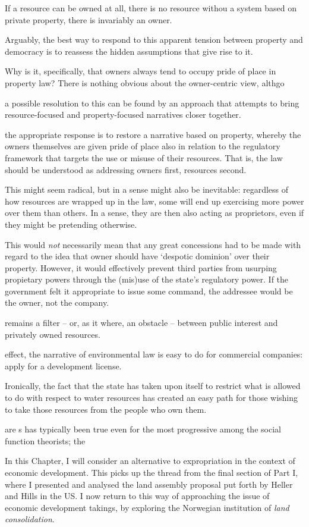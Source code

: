 {{If a resource can be owned at all, there is no resource withou  a system based on private property, there is invariably an owner.

Arguably, the best way to respond to this apparent tension between property and democracy is to reassess the hidden assumptions that give rise to it.




Why is it, specifically, that owners always tend to occupy pride of place in property law? There is nothing obvious about the owner-centric view, althgo

a possible resolution to this can be found by an approach that attempts to bring resource-focused and property-focused narratives closer together. 





the appropriate response is to restore a narrative based on property, whereby the owners themselves are given pride of place also in relation to the regulatory framework that targets the use or misuse of their resources. That is, the law should be understood as addressing owners first, resources second.

This might seem radical, but in a sense might also be inevitable: regardless of how resources are wrapped up in the law, some will end up exercising more power over them than others. In a sense, they are then also acting as proprietors, even if they might be pretending otherwise. 


This would {\it not} necessarily mean that any great concessions had to be made with regard to the idea that owner should have `despotic dominion' over their property. However, it would effectively prevent third parties from usurping propietary powers through the (mis)use of the state's regulatory power. If the government felt it appropriate to issue some command, the addressee would be the owner, not the company.



remains a filter -- or, as it where, an obstacle -- between public interest and privately owned resources. 



effect, the narrative of environmental law  is easy to do for commercial companies: apply for a development license. 

Ironically, the fact that the state has taken upon itself to restrict what is allowed to do with respect to water resources has created an easy path for those wishing to take those resources from the people who own them. 




are s  has typically been true even for the most progressive among the social function theorists; the 
}

In this Chapter, I will consider an alternative to expropriation in the context of economic development. This picks up the thread from the final section of Part I, where I presented and analysed the land assembly proposal put forth by Heller and Hills in the US. I now return to this way of approaching the issue of economic development takings, by exploring the Norwegian institution of {\it land consolidation}.
}

